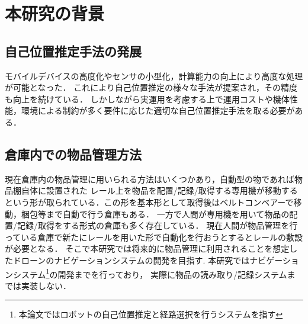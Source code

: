\section{本研究の背景}
\subsection{自己位置推定手法の発展}
モバイルデバイスの高度化やセンサの小型化，計算能力の向上により高度な処理が可能となった．
これにより自己位置推定の様々な手法が提案され，その精度も向上を続けている．
しかしながら実運用を考慮する上で運用コストや機体性能，環境による制約が多く要件に応じた適切な自己位置推定手法を取る必要がある．

\subsection{倉庫内での物品管理方法}
現在倉庫内の物品管理に用いられる方法はいくつかあり，自動型の物であれば物品棚自体に設置された
レール上を物品を配置/記録/取得する専用機が移動するという形が取られている．この形を基本形として取得後はベルトコンベアーで移動，梱包等まで自動で行う倉庫もある．
一方で人間が専用機を用いて物品の配置/記録/取得をする形式の倉庫も多く存在している．
現在人間が物品管理を行っている倉庫で新たにレールを用いた形で自動化を行おうとするとレールの敷設が必要となる．
そこで本研究では将来的に物品管理に利用されることを想定したドローンのナビゲーションシステムの開発を目指す.
本研究ではナビゲーションシステム\footnote{本論文ではロボットの自己位置推定と経路選択を行うシステムを指す}の開発までを行っており，
実際に物品の読み取り/記録システムまでは実装しない．